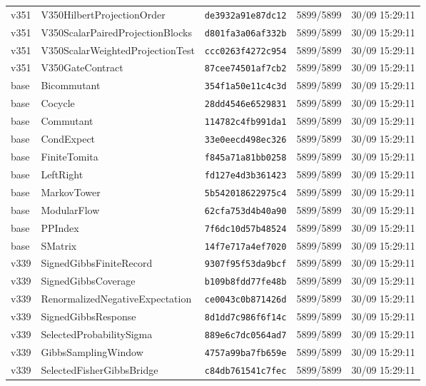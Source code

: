 \documentclass[11pt]{article}
\theoremstyle{definition}\newtheorem{deriv}{Derivation}
\begin{document}
{\begin{longtable}{@{}lllll@{}}
v351 & V350HilbertProjectionOrder & \texttt{de3932a91e87dc12} & 5899/5899 & 30/09 15:29:11 \\
v351 & V350ScalarPairedProjectionBlocks & \texttt{d801fa3a06af332b} & 5899/5899 & 30/09 15:29:11 \\
v351 & V350ScalarWeightedProjectionTest & \texttt{ccc0263f4272c954} & 5899/5899 & 30/09 15:29:11 \\
v351 & V350GateContract & \texttt{87cee74501af7cb2} & 5899/5899 & 30/09 15:29:11 \\
base & Bicommutant & \texttt{354f1a50e11c4c3d} & 5899/5899 & 30/09 15:29:11 \\
base & Cocycle & \texttt{28dd4546e6529831} & 5899/5899 & 30/09 15:29:11 \\
base & Commutant & \texttt{114782c4fb991da1} & 5899/5899 & 30/09 15:29:11 \\
base & CondExpect & \texttt{33e0eecd498ec326} & 5899/5899 & 30/09 15:29:11 \\
base & FiniteTomita & \texttt{f845a71a81bb0258} & 5899/5899 & 30/09 15:29:11 \\
base & LeftRight & \texttt{fd127e4d3b361423} & 5899/5899 & 30/09 15:29:11 \\
base & MarkovTower & \texttt{5b542018622975c4} & 5899/5899 & 30/09 15:29:11 \\
base & ModularFlow & \texttt{62cfa753d4b40a90} & 5899/5899 & 30/09 15:29:11 \\
base & PPIndex & \texttt{7f6dc10d57b48524} & 5899/5899 & 30/09 15:29:11 \\
base & SMatrix & \texttt{14f7e717a4ef7020} & 5899/5899 & 30/09 15:29:11 \\
v339 & SignedGibbsFiniteRecord & \texttt{9307f95f53da9bcf} & 5899/5899 & 30/09 15:29:11 \\
v339 & SignedGibbsCoverage & \texttt{b109b8fdd77fe48b} & 5899/5899 & 30/09 15:29:11 \\
v339 & RenormalizedNegativeExpectation & \texttt{ce0043c0b871426d} & 5899/5899 & 30/09 15:29:11 \\
v339 & SignedGibbsResponse & \texttt{8d1dd7c986f6f14c} & 5899/5899 & 30/09 15:29:11 \\
v339 & SelectedProbabilitySigma & \texttt{889e6c7dc0564ad7} & 5899/5899 & 30/09 15:29:11 \\
v339 & GibbsSamplingWindow & \texttt{4757a99ba7fb659e} & 5899/5899 & 30/09 15:29:11 \\
v339 & SelectedFisherGibbsBridge & \texttt{c84db761541c7fec} & 5899/5899 & 30/09 15:29:11 \\

\end{longtable}}
\end{document}
